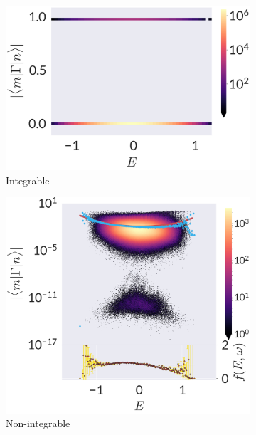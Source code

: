 \begin{figure}
\centering
\begin{subfigure}[t]{0.33\textwidth}
	\centering
\includegraphics[width=\columnwidth]{figures/chapter1/Gamma-E-I.png}
\caption{Integrable}
\end{subfigure}%
\begin{subfigure}[t]{0.33\textwidth}
	\centering
\includegraphics[width=\columnwidth]{figures/chapter1/Gamma-E-01.png}
\caption{Non-integrable}
\end{subfigure}%
\begin{subfigure}[t]{0.33\textwidth}
	\centering

\end{subfigure}
\end{figure}
